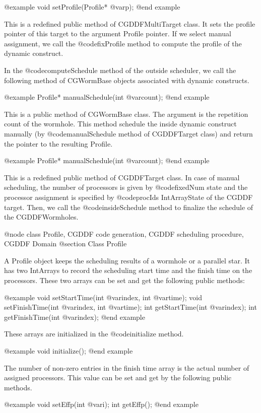 {@example
void setProfile(Profile* @var{p});
@end example

This is a redefined public method of CGDDFMultiTarget class. It sets the
profile pointer of this target to the argument Profile pointer.
If we select manual assignment, we call the @code{fixProfile} method to
compute the profile of the dynamic construct.

In the @code{computeSchedule} method of the outside scheduler, we call
the following method of CGWormBase objects associated with dynamic
constructs.

@example
Profile* manualSchedule(int @var{count});
@end example

This is a public method of CGWormBase class. The argument is the repetition
count of the wormhole. This method schedule the inside dynamic construct
manually (by @code{manualSchedule} method of CGDDFTarget class) and return
the pointer to the resulting Profile.

@example
Profile* manualSchedule(int @var{count});
@end example

This is a redefined public method of CGDDFTarget class. In case of
manual scheduling, the number of processors is given by @code{fixedNum}
state and the processor assignment is specified by @code{procIds}
IntArrayState of the CGDDF target. Then, we call the @code{insideSchedule}
method to finalize the schedule of the CGDDFWormholes.

@node class Profile, CGDDF code generation, CGDDF scheduling procedure, CGDDF Domain
@section Class Profile

A Profile object keeps the scheduling results of a wormhole or a parallel star.
It has two IntArrays to record the scheduling start time and the finish
time on the processors. These two arrays can be set and get the following
public methods:

@example
void setStartTime(int @var{index}, int @var{time});
void setFinishTime(int @var{index}, int @var{time});
int getStartTime(int @var{index});
int getFinishTime(int @var{index});
@end example

These arrays are initialized in the @code{initialize} method.

@example
void initialize();
@end example

The number of non-zero entries in the finish time array is the
actual number of assigned processors. This value can be set and get by
the following public methods.

@example
void setEffp(int @var{i});
int getEffp();
@end example

}
